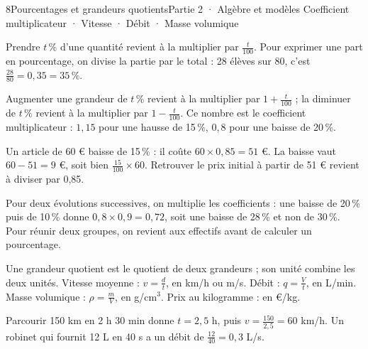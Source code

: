 \begin{ouverture}[calcul]{8}{Pourcentages et grandeurs quotients}{Partie 2 · Algèbre et modèles}
{Coefficient multiplicateur · Vitesse · Débit · Masse volumique}
\end{ouverture}
\pagestyle{otMain}\essentiel\fontsize{11}{15}\selectfont
{}\label{cours-8-1}
\begin{propriete}Prendre $t\,\%$ d’une quantité revient à la multiplier par $\frac t{100}$. Pour exprimer une part en pourcentage, on divise la partie par le total : 28 élèves sur 80, c’est $\frac{28}{80}=0{,}35=35\,\%$.\end{propriete}
\begin{definition}Augmenter une grandeur de $t\,\%$ revient à la multiplier par $1+\frac t{100}$ ; la diminuer de $t\,\%$ revient à la multiplier par $1-\frac t{100}$. Ce nombre est le coefficient multiplicateur : $1{,}15$ pour une hausse de 15\,\%, $0{,}8$ pour une baisse de 20\,\%.\end{definition}
\begin{exemple}Un article de 60 € baisse de 15\,\% : il coûte $60\times0{,}85=51$ €. La baisse vaut $60-51=9$ €, soit bien $\frac{15}{100}\times60$. Retrouver le prix initial à partir de 51 € revient à diviser par 0,85.\end{exemple}
\begin{attention}Pour deux évolutions successives, on multiplie les coefficients : une baisse de 20\,\% puis de 10\,\% donne $0{,}8\times0{,}9=0{,}72$, soit une baisse de 28\,\% et non de 30\,\%. Pour réunir deux groupes, on revient aux effectifs avant de calculer un pourcentage.\end{attention}
\clearpage
{}\label{cours-8-2}
\begin{definition}Une grandeur quotient est le quotient de deux grandeurs ; son unité combine les deux unités. Vitesse moyenne : $v=\frac dt$, en km/h ou m/s. Débit : $q=\frac Vt$, en L/min. Masse volumique : $\rho=\frac mV$, en g/cm$^3$. Prix au kilogramme : en €/kg.\end{definition}
\begin{exemple}Parcourir 150 km en 2 h 30 min donne $t=2{,}5$ h, puis $v=\frac{150}{2{,}5}=60$ km/h. Un robinet qui fournit 12 L en 40 s a un débit de $\frac{12}{40}=0{,}3$ L/s.\end{exemple}
